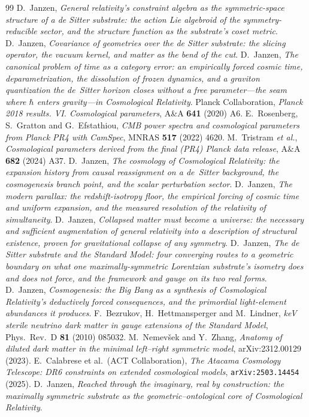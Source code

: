 \documentclass[11pt,a4paper]{article}
\theoremstyle{plain}
\theoremstyle{definition}
\begin{document}
\begin{thebibliography}{99}
 D.~Janzen, \emph{General relativity's constraint algebra as the symmetric-space structure of a de Sitter substrate: the action Lie algebroid of the symmetry-reducible sector, and the structure function as the substrate's coset metric}.
 D.~Janzen, \emph{Covariance of geometries over the de Sitter substrate: the slicing operator, the vacuum kernel, and matter as the bend of the cut}.
 D.~Janzen, \emph{The canonical problem of time as a category error: an empirically forced cosmic time, deparametrization, the dissolution of frozen dynamics, and a graviton quantization the de~Sitter horizon closes without a free parameter---the seam where $\hbar$ enters gravity---in Cosmological Relativity}.
 Planck Collaboration, \emph{Planck 2018 results. VI. Cosmological parameters}, A\&A \textbf{641} (2020) A6.
 E.~Rosenberg, S.~Gratton and G.~Efstathiou, \emph{CMB power spectra and cosmological parameters from Planck PR4 with CamSpec}, MNRAS \textbf{517} (2022) 4620.
 M.~Tristram \emph{et al.}, \emph{Cosmological parameters derived from the final (PR4) Planck data release}, A\&A \textbf{682} (2024) A37.
 D.~Janzen, \emph{The cosmology of Cosmological Relativity: the expansion history from causal reassignment on a de~Sitter background, the cosmogenesis branch point, and the scalar perturbation sector}.
 D.~Janzen, \emph{The modern parallax: the redshift-isotropy floor, the empirical forcing of cosmic time and uniform expansion, and the measured resolution of the relativity of simultaneity}.
 D.~Janzen, \emph{Collapsed matter must become a universe: the necessary and sufficient augmentation of general relativity into a description of structural existence, proven for gravitational collapse of any symmetry}.
 D.~Janzen, \emph{The de Sitter substrate and the Standard Model: four converging routes to a geometric boundary on what one maximally-symmetric Lorentzian substrate's isometry does and does not force, and the framework and gauge on its two real forms}.
 D.~Janzen, \emph{Cosmogenesis: the Big Bang as a synthesis of Cosmological Relativity's deductively forced consequences, and the primordial light-element abundances it produces}.
 F.~Bezrukov, H.~Hettmansperger and M.~Lindner, \emph{keV sterile neutrino dark matter in gauge extensions of the Standard Model}, Phys.\ Rev.\ D \textbf{81} (2010) 085032.
 M.~Nemev\v{s}ek and Y.~Zhang, \emph{Anatomy of diluted dark matter in the minimal left--right symmetric model}, arXiv:2312.00129 (2023).
 E.~Calabrese et al.\ (ACT Collaboration), \emph{The Atacama Cosmology Telescope: DR6 constraints on extended cosmological models}, \texttt{arXiv:2503.14454} (2025).
 D.~Janzen, \emph{Reached through the imaginary, real by construction: the maximally symmetric substrate as the geometric--ontological core of Cosmological Relativity}.
\end{thebibliography}


\end{document}
